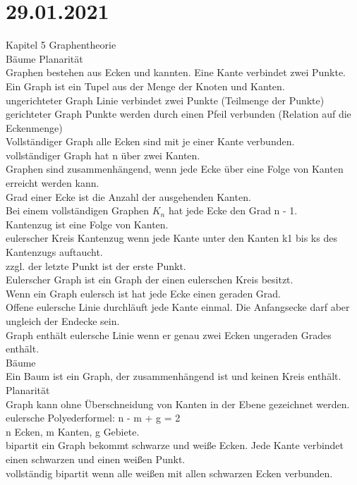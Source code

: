 \documentclass{article}
\begin{document}
	\section*{29.01.2021}
	Kapitel 5 Graphentheorie \\
	Bäume Planarität \\
	Graphen bestehen aus Ecken und kannten. Eine Kante verbindet zwei Punkte. \\
	Ein Graph ist ein Tupel aus der Menge der Knoten und Kanten. \\
	ungerichteter Graph Linie verbindet zwei Punkte (Teilmenge der Punkte) \\
	gerichteter Graph Punkte werden durch einen Pfeil verbunden (Relation auf die Eckenmenge) \\
	Vollständiger Graph alle Ecken sind mit je einer Kante verbunden. \\
	vollständiger Graph hat n über zwei Kanten. \\
	Graphen sind zusammenhängend, wenn jede Ecke über eine Folge von Kanten erreicht werden kann. \\
	Grad einer Ecke ist die Anzahl der ausgehenden Kanten. \\
	Bei einem vollständigen Graphen $K_n$ hat jede Ecke den Grad n - 1. \\
	Kantenzug ist eine Folge von Kanten. \\
	eulerscher Kreis Kantenzug wenn jede Kante unter den Kanten k1 bis ks des Kantenzugs auftaucht. \\
	zzgl. der letzte Punkt ist der erste Punkt. \\
	Eulerscher Graph ist ein Graph der einen eulerschen Kreis besitzt. \\
	Wenn ein Graph eulersch ist hat jede Ecke einen geraden Grad. \\
	Offene eulersche Linie durchläuft jede Kante einmal. Die Anfangsecke darf aber ungleich der Endecke sein. \\
	Graph enthält eulersche Linie wenn er genau zwei Ecken ungeraden Grades enthält. \\
	Bäume \\
	Ein Baum ist ein Graph, der zusammenhängend ist und keinen Kreis enthält. \\
	Planarität \\
	Graph kann ohne Überschneidung von Kanten in der Ebene gezeichnet werden. \\
	eulersche Polyederformel: n - m + g = 2 \\
	n Ecken, m Kanten, g Gebiete. \\
	bipartit ein Graph bekommt schwarze und weiße Ecken. Jede Kante verbindet einen schwarzen und einen weißen Punkt. \\
	vollständig bipartit wenn alle weißen mit allen schwarzen Ecken verbunden. \\
\end{document}
